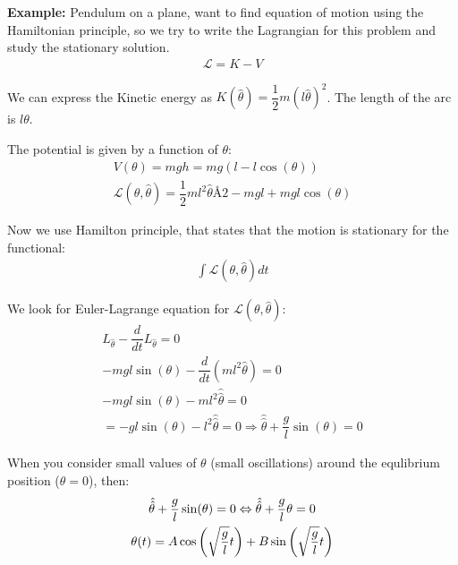 \par\bigskip
\noindent\textbf{Example:} Pendulum on a plane, want to find equation of motion using the Hamiltonian principle, so we try to write the Lagrangian for this problem and study the stationary solution.
\begin{equation*}
  \begin{gathered}
    \mathcal{L} = K-V
  \end{gathered}
\end{equation*}\par
\noindent We can express the Kinetic energy as $K(\hat{\theta}) = \dfrac{1}{2}m(l\hat{\theta})^2$. The length of the arc is $l\theta$.\par
\noindent The potential is given by a function of $\theta$:
\begin{equation*}
  \begin{gathered}
    V(\theta) = mgh = mg(l-l\cos(\theta))\\
    \mathcal{L}(\theta,\hat{\theta}) = \dfrac{1}{2}ml^2\hat{\theta}Å2-mgl+mgl\cos(\theta)
  \end{gathered}
\end{equation*}\par
\noindent Now we use Hamilton principle, that states that the motion is stationary for the functional:
\begin{equation*}
  \begin{gathered}
    \int\mathcal{L}(\theta,\hat{\theta})dt
  \end{gathered}
\end{equation*}\par
\noindent We look for Euler-Lagrange equation for $\mathcal{L}(\theta,\hat{\theta})$:
\begin{equation*}
  \begin{gathered}
    L_{\hat{\theta}} -\dfrac{d}{dt}L_{\hat{\theta}} = 0\\
    -mgl\sin(\theta)-\dfrac{d}{dt}\left(ml^2\hat{\theta}\right) =0\\
    -mgl\sin(\theta)-ml^2\hat{\hat{\theta}} = 0\\
    = -gl\sin(\theta)-l^2\hat{\hat{\theta}} = 0\Rightarrow \hat{\hat{\theta}}+\dfrac{g}{l}\sin(\theta) = 0
  \end{gathered}
\end{equation*}
\par\bigskip
\noindent When you consider small values of $\theta$ (small oscillations) around the equlibrium position ($\theta = 0$), then:
\begin{equation*}
  \begin{gathered}
    \hat{\hat{\theta}}+\dfrac{g}{l}\sin(\theta) = 0\Leftrightarrow \hat{\hat{\theta}}+\dfrac{g}{l}\theta = 0\\
    \theta(t) = A\cos\left(\sqrt{\dfrac{g}{l}}t\right)+B\sin\left(\sqrt{\dfrac{g}{l}}t\right)
  \end{gathered}
\end{equation*}\par
